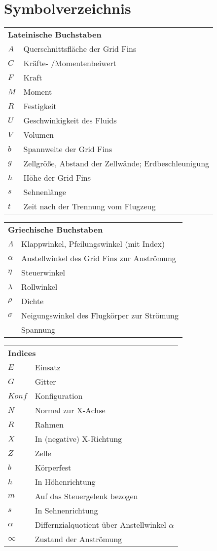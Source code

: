 \chapter*{Symbolverzeichnis}						%

\begin{longtable}[l]{ll}
\multicolumn{2}{l}{\textbf{Lateinische Buchstaben}}\\
$A$&Querschnittsfläche der Grid Fins\\
$C$&Kräfte- /Momentenbeiwert\\
$F$&Kraft\\
$M$&Moment\\
$R$&Festigkeit\\
$U$&Geschwinkigkeit des Fluids\\
$V$&Volumen\\
$b$&Spannweite der Grid Fins\\
$g$&Zellgröße, Abstand der Zellwände; Erdbeschleunigung\\
$h$&Höhe der Grid Fins\\
$s$&Sehnenlänge\\
$t$&Zeit nach der Trennung vom Flugzeug\\
\end{longtable}


\begin{longtable}[l]{ll}
	\multicolumn{2}{l}{\textbf{Griechische Buchstaben}}\\
	$\Lambda$&Klappwinkel, Pfeilungswinkel (mit Index)\\
	$\alpha$&Anstellwinkel des Grid Fins zur Anströmung\\
	$\eta$&Steuerwinkel\\
	$\lambda$&Rollwinkel\\
	$\rho$&Dichte\\
	$\sigma$&Neigungswinkel des Flugkörper zur Strömung\\
	~&Spannung\\
\end{longtable}

\begin{longtable}[l]{ll}
	\multicolumn{2}{l}{\textbf{Indices}}\\
	$E$&Einsatz\\
	$G$&Gitter\\
	$Konf$&Konfiguration\\
	$N$&Normal zur X-Achse\\
	$R$&Rahmen\\
	$X$&In (negative) X-Richtung\\
	$Z$&Zelle\\
	$b$&Körperfest\\
	$h$&In Höhenrichtung\\
	$m$&Auf das Steuergelenk bezogen\\
	$s$&In Sehnenrichtung\\
	$\alpha$&Differnzialquotient über Anstellwinkel $\alpha$\\
	$\infty$&Zustand der Anströmung\\
\end{longtable}

